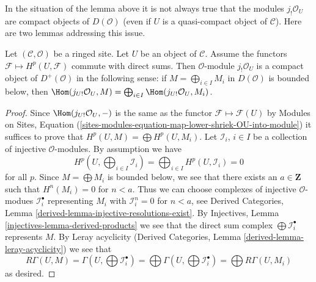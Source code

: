 \noindent
In the situation of the lemma above it is not always true that the
modules $j_!\mathcal{O}_U$ are compact objects of $D(\mathcal{O})$
(even if $U$ is a quasi-compact object of $\mathcal{C}$).
Here are two lemmas addressing this issue.


\begin{lemma}
\label{lemma-when-jshriek-lower-compact}
Let $(\mathcal{C}, \mathcal{O})$ be a ringed site. Let $U$ be an object of
$\mathcal{C}$. Assume the functors $\mathcal{F} \mapsto H^p(U, \mathcal{F})$
commute with direct sums. Then $\mathcal{O}$-module $j_!\mathcal{O}_U$ is a
compact object of $D^+(\mathcal{O})$ in the following sense:
if $M = \bigoplus_{i \in I} M_i$ in $D(\mathcal{O})$ is
bounded below, then $\Hom(j_{U!}\mathcal{O}_U, M) =
\bigoplus_{i \in I} \Hom(j_{U!}\mathcal{O}_U, M_i)$.
\end{lemma}

\begin{proof}
Since $\Hom(j_{U!}\mathcal{O}_U, -)$ is the same as the functor
$\mathcal{F} \mapsto \mathcal{F}(U)$ by
Modules on Sites, Equation
(\ref{sites-modules-equation-map-lower-shriek-OU-into-module}) it suffices
to prove that $H^p(U, M) = \bigoplus H^p(U, M_i)$.
Let $\mathcal{I}_i$, $i \in I$ be a collection of injective
$\mathcal{O}$-modules. By assumption we have
$$
H^p(U, \bigoplus\nolimits_{i \in I} \mathcal{I}_i) =
\bigoplus\nolimits_{i \in I} H^p(U, \mathcal{I}_i) = 0
$$
for all $p$. Since $M = \bigoplus M_i$ is bounded below, we
see that there exists an $a \in \mathbf{Z}$ such that $H^n(M_i) = 0$
for $n < a$. Thus we can choose complexes of injective $\mathcal{O}$-modues
$\mathcal{I}_i^\bullet$ representing $M_i$
with $\mathcal{I}_i^n = 0$ for $n < a$, see
Derived Categories, Lemma \ref{derived-lemma-injective-resolutions-exist}.
By Injectives, Lemma \ref{injectives-lemma-derived-products}
we see that the direct sum complex $\bigoplus \mathcal{I}_i^\bullet$
represents $M$. By Leray acyclicity
(Derived Categories, Lemma \ref{derived-lemma-leray-acyclicity})
we see that
$$
R\Gamma(U, M) = \Gamma(U, \bigoplus \mathcal{I}_i^\bullet) =
\bigoplus \Gamma(U, \bigoplus \mathcal{I}_i^\bullet) =
\bigoplus R\Gamma(U, M_i)
$$
as desired.
\end{proof}

